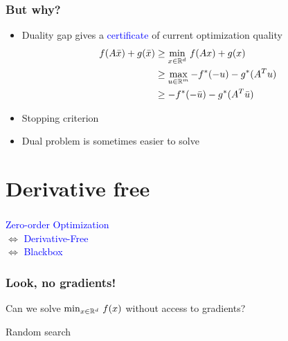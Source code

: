 \documentclass[aspectratio=149]{beamer}
\begin{document}
\begin{frame}
  \frametitle{But why?}
  \begin{itemize}
    \item Duality gap gives a \textcolor{blue}{certificate} of current optimization quality
          \begin{equation}
            \begin{aligned}
              f(A \bar{x}) + g(\bar{x}) &\ge \min_{x\in\mathbb{R}^d} \, f(Ax) + g(x) \\
              & \ge \max_{u\in\mathbb{R}^m} - f^*(-u) - g^*(A^T u) \\
              &\ge -f^*(-\bar{u}) - g^*(A^T \bar{u})
            \end{aligned}
          \end{equation}
    \item Stopping criterion
    \item Dual problem is sometimes easier to solve
  \end{itemize}
\end{frame}


\section{Derivative free}%
\label{sec:}


\begin{frame}
  \frametitle{}

  \begin{center}
    \Huge\textcolor{blue}{Zero-order Optimization}\\
    $\Leftrightarrow$ \textcolor{blue}{Derivative-Free}\\
    $\Leftrightarrow$ \textcolor{blue}{Blackbox}
  \end{center}


\end{frame}

\begin{frame}
  \frametitle{Look, no gradients!}
  Can we solve $\min_{x\in \mathbb{R}^d}\, f(x)$ without access to gradients?

  \begin{algorithm}[H]
    \caption{Random search}
    \begin{algorithmic}[1]
      \EndFor{}
    \end{algorithmic}
  \end{algorithm}

\end{frame}
\end{document}
